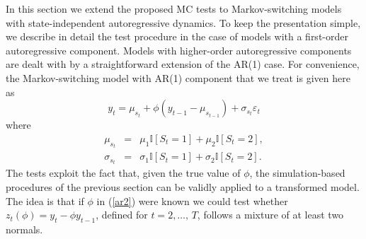 \documentclass[11pt]{article}
\begin{document}
In this section we extend the proposed MC tests to Markov-switching models
with state-independent autoregressive dynamics. To keep the presentation
simple, we describe in detail the test procedure in the case of models with
a first-order autoregressive component. Models with higher-order
autoregressive components are dealt with by a straightforward extension of
the AR(1) case. For convenience, the Markov-switching model with AR(1)
component that we treat is given here as 
\begin{equation}
y_{t}=\mu _{s_{t}}+\phi (y_{t-1}-\mu _{s_{t-1}})+\sigma _{s_{t}}\varepsilon
_{t}  \label{ar2}
\end{equation}%
where 
\begin{eqnarray*}
\mu _{s_{t}} &=&\mu _{1}\mathbb{I}[S_{t}=1]+\mu _{2}\mathbb{I}[S_{t}=2], \\
\sigma _{s_{t}} &=&\sigma _{1}\mathbb{I}[S_{t}=1]+\sigma _{2}\mathbb{I}%
[S_{t}=2].
\end{eqnarray*}%
The tests exploit the fact that, given the true value of $\phi $, the
simulation-based procedures of the previous section can be validly applied
to a transformed model. The idea is that if $\phi $ in (\ref{ar2}) were
known we could test whether $z_{t}(\phi )=y_{t}-\phi y_{t-1}$, defined for $%
t=2,\ldots ,\,T$, follows a mixture of at least two normals.
\end{document}
